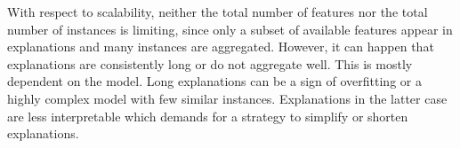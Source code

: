 With respect to scalability, neither the total number of features nor the total number of instances is limiting, since only a subset of available features appear in explanations and many instances are aggregated. However, it can happen that explanations are consistently long or do not aggregate well. This is mostly dependent on the model. Long explanations can be a sign of overfitting or a highly complex model with few similar instances. Explanations in the latter case are less interpretable which demands for a strategy to simplify or shorten explanations.














